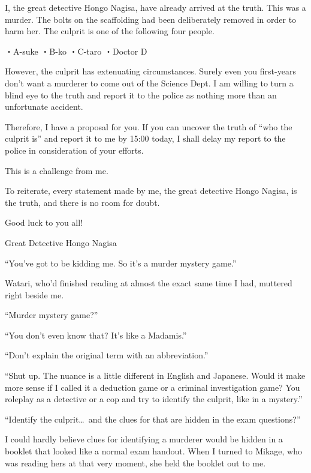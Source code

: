 \documentclass[
    a4paper,
    12pt,
    twoside,
    openany,
    UTF8,
    fontset=windows
]{ctexbook}
\begin{document}
I, the great detective Hongo Nagisa, have already arrived at the truth. This was a murder. The bolts on the scaffolding had been deliberately removed in order to harm her. The culprit is one of the following four people.

\begin{center}
・A-suke \quad ・B-ko \quad ・C-taro \quad ・Doctor D
\end{center}

However, the culprit has extenuating circumstances. Surely even you first-years don't want a murderer to come out of the Science Dept. I am willing to turn a blind eye to the truth and report it to the police as nothing more than an unfortunate accident.

Therefore, I have a proposal for you. If you can uncover the truth of ``who the culprit is'' and report it to me by 15:00 today, I shall delay my report to the police in consideration of your efforts.

This is a challenge from me.

To reiterate, every statement made by me, the great detective Hongo Nagisa, is the truth, and there is no room for doubt.

Good luck to you all!

\begin{flushright}
Great Detective Hongo Nagisa
\end{flushright}

``You've got to be kidding me. So it's a murder mystery game.''

Watari, who'd finished reading at almost the exact same time I had, muttered right beside me.

``Murder mystery game?''

``You don't even know that? It's like a Madamis.''

``Don't explain the original term with an abbreviation.''

``Shut up. The nuance is a little different in English and Japanese. Would it make more sense if I called it a deduction game or a criminal investigation game? You roleplay as a detective or a cop and try to identify the culprit, like in a mystery.''

``Identify the culprit\dots\ and the clues for that are hidden in the exam questions?''

I could hardly believe clues for identifying a murderer would be hidden in a booklet that looked like a normal exam handout. When I turned to Mikage, who was reading hers at that very moment, she held the booklet out to me.
\end{document}
